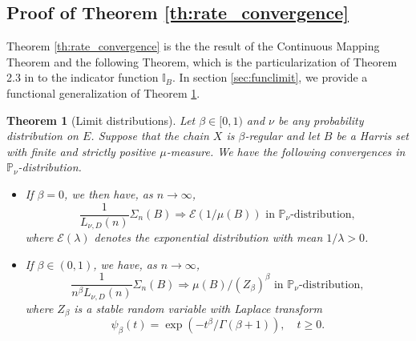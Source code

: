 \documentclass[sn-mathphys-ay]{sn-jnl}%
\newtheorem{theorem}{Theorem}[section]%
\newcommand{\I}{\mathbb{I}}
\begin{document}
\begin{appendices}
\subsection{Proof of Theorem \ref{th:rate_convergence}}

Theorem \ref{th:rate_convergence} is the the result of the Continuous Mapping Theorem
and the following Theorem, which is the particularization of Theorem 2.3 in
\cite{Chen1999} to the indicator function \(\I_B\). In section \ref{sec:funclimit},
we provide a functional generalization of Theorem \ref{thm:weaklimit}.

\begin{theorem}[Limit distributions] \label{thm:weaklimit} Let $\beta\in[0,1)$
    and $\nu$ be any probability distribution on $E$. Suppose that the chain $X$ is
    $\beta$-regular and let $B$ be a Harris set with finite and strictly
    positive $\mu$-measure. We have the following convergences
    in $\mathbb{P}_{\nu}$-distribution.
    \begin{itemize}
        \item[(i)] If $\beta=0$, we then have, as $n\rightarrow \infty$,
              \[\frac{1}{L_{\nu, D}(n)}\Sigma_n(B)\Rightarrow \mathcal{E}(1/\mu(B))
                  \text{ in } \mathbb{P}_{\nu}\text{-distribution},\]
              where $\mathcal{E}(\lambda)$ denotes the exponential distribution with
              mean $1/\lambda>0$.
        \item[(ii)] If $\beta \in (0,1)$, we have, as $n\rightarrow \infty$,
              \[\frac{1}{n^{\beta}L_{\nu, D}(n)}\Sigma_n(B)\Rightarrow \mu(B)/(Z_{\beta})^{\beta}
                  \text{ in } \mathbb{P}_{\nu}\text{-distribution},\]
              where $Z_{\beta}$ is a stable random variable with Laplace transform
              \[\psi_{\beta}\left ( t \right )=\exp\left (-t^{\beta}/\Gamma( \beta+1) \right ),\quad t\geq 0.\]
    \end{itemize}
\end{theorem}


\end{appendices}
\end{document}
